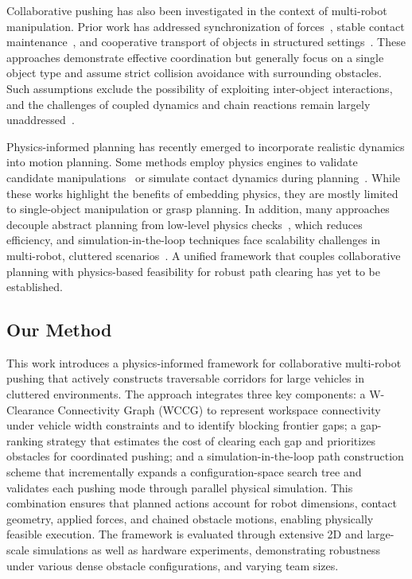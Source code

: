 Collaborative pushing has also been investigated in the context of
multi-robot manipulation. Prior work has addressed synchronization of
forces~\cite{ni2023progressive}, stable contact maintenance~\cite{liu2025physics}, and cooperative
transport of objects in structured settings~\cite{ni2024physics}. These approaches
demonstrate effective coordination but generally focus on a single object
type and assume strict collision avoidance with surrounding obstacles.
Such assumptions exclude the possibility of exploiting inter-object
interactions, and the challenges of coupled dynamics and chain reactions
remain largely unaddressed~\cite{feng2025learning}.

Physics-informed planning has recently emerged to incorporate realistic
dynamics into motion planning. Some methods employ physics engines to
validate candidate manipulations~\cite{lin2019efficient} or simulate contact dynamics
during planning~\cite{rouxel2024multi}. While these works highlight the benefits of
embedding physics, they are mostly limited to single-object manipulation
or grasp planning. In addition, many approaches decouple abstract
planning from low-level physics checks~\cite{ni2023progressive}, which reduces efficiency,
and simulation-in-the-loop techniques face scalability challenges in
multi-robot, cluttered scenarios~\cite{feng2025learning}. A unified framework that
couples collaborative planning with physics-based feasibility for robust
path clearing has yet to be established.
\subsection{Our Method}\label{subsec:intro-our}

This work introduces a physics-informed framework for collaborative multi-robot
pushing that actively constructs traversable corridors for large vehicles in
cluttered environments. The approach integrates three key components: a
W-Clearance Connectivity Graph (WCCG) to represent workspace connectivity under
vehicle width constraints and to identify blocking frontier gaps; a gap-ranking
strategy that estimates the cost of clearing each gap and prioritizes obstacles
for coordinated pushing; and a simulation-in-the-loop path construction scheme
that incrementally expands a configuration-space search tree and validates each
pushing mode through parallel physical simulation. This combination ensures that
planned actions account for robot dimensions, contact geometry, applied forces,
and chained obstacle motions, enabling physically feasible execution. The
framework is evaluated through extensive 2D and large-scale simulations as well
as hardware experiments, demonstrating robustness
under various dense obstacle configurations, and varying
team sizes.

